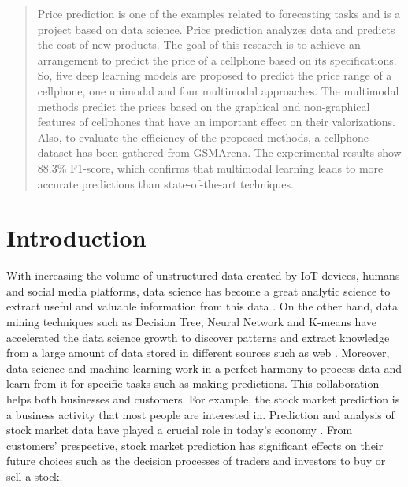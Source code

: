 \documentclass{svjour3}                     \smartqed  \usepackage{graphicx}
\begin{document}
\begin{abstract}


Price prediction is one of the examples related to forecasting tasks and is a project based on data science. Price prediction analyzes data and predicts the cost of new products. The goal of this research is to achieve an arrangement to predict the price of a cellphone based on its specifications.  So, five deep learning models are proposed to predict the price range of a cellphone, one unimodal and four multimodal approaches. The multimodal methods predict the prices based on the graphical and non-graphical features of cellphones that have an important effect on their valorizations. Also, to evaluate the efficiency of the proposed methods, a cellphone dataset has been gathered from GSMArena. The experimental results show 88.3\% F1-score, which confirms that multimodal learning leads to more accurate predictions than state-of-the-art techniques.

\end{abstract}



\section{Introduction}\label{Sec:Introduction}
With increasing the volume of unstructured data created by IoT devices, humans and social media platforms, data science has become a great analytic science to extract useful and valuable information from this data \cite{Tien2017}.  On the other hand, data mining techniques such as Decision Tree, Neural Network and K-means have accelerated the data science growth to discover patterns  and  extract  knowledge  from a large amount of data stored in different sources such as web \cite{olson2007introduction, sohrabi2012framework, jian2013parallel}. Moreover, data science and machine learning work in a perfect harmony to process data and learn from it for specific tasks such as making predictions. This collaboration helps both businesses and customers. For example, the stock market prediction is a business activity that most people are interested in. Prediction and analysis of stock market data have played a crucial role in today’s economy \cite{Hiransha2018}. From customers' prespective, stock market prediction has significant effects on their future choices such as the decision processes of traders and investors to buy or sell a stock.
\end{document}
